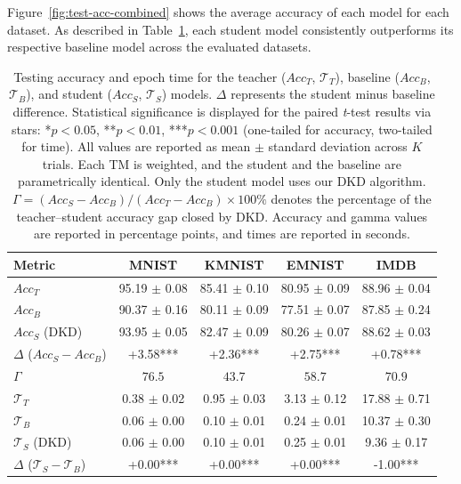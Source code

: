 \documentclass[sn-mathphys-num]{sn-jnl}%
\theoremstyle{thmstyleone}%
\theoremstyle{thmstyletwo}%
\theoremstyle{thmstylethree}%
\begin{document}
Figure~\ref{fig:test-acc-combined} shows the average accuracy of each model for each dataset. As described in Table~\ref{tab:test-table-dkd}, each student model consistently outperforms its respective baseline model across the evaluated datasets. 

\begin{table}
	\centering
	\caption{Testing accuracy and epoch time for the teacher ($Acc_T$, $\mathcal{T}_T$), baseline ($Acc_B$, $\mathcal{T}_B$), and student ($Acc_S$, $\mathcal{T}_S$) models. $\Delta$ represents the student minus baseline difference. Statistical significance is displayed for the paired \textit{t}-test results via stars: {*}$p < 0.05$, {**}$p < 0.01$, {***}$p < 0.001$ (one-tailed for accuracy, two-tailed for time). All values are reported as mean $\pm$ standard deviation across $K$ trials. Each TM is weighted, and the student and the baseline are parametrically identical. Only the student model uses our DKD algorithm. $\Gamma = (Acc_S - Acc_B)/(Acc_T - Acc_B) \times 100\%$ denotes the percentage of the teacher--student accuracy gap closed by DKD. Accuracy and gamma values are reported in percentage points, and times are reported in seconds.}
	\begin{tabular}{l|cccc}
		\hline
		Metric & MNIST & KMNIST & EMNIST & IMDB \\
		\hline
		$Acc_T$ & 95.19 $\pm$ 0.08 & 85.41 $\pm$ 0.10 & 80.95 $\pm$ 0.09 & 88.96 $\pm$ 0.04 \\
		$Acc_B$ & 90.37 $\pm$ 0.16 & 80.11 $\pm$ 0.09 & 77.51 $\pm$ 0.07 & 87.85 $\pm$ 0.24 \\
		$Acc_S$ (DKD) & 93.95 $\pm$ 0.05 & 82.47 $\pm$ 0.09 & 80.26 $\pm$ 0.07 & 88.62 $\pm$ 0.03 \\
		$\Delta$ ($Acc_S-Acc_B$) & +3.58*** & +2.36*** & +2.75*** & +0.78*** \\
		$\Gamma$             & $76.5$        & $43.7$        & $58.7$        & $70.9$        \\
		\hline
		$\mathcal{T}_T$ & 0.38 $\pm$ 0.02 & 0.95 $\pm$ 0.03 & 3.13 $\pm$ 0.12 & 17.88 $\pm$ 0.71 \\
		$\mathcal{T}_B$ & 0.06 $\pm$ 0.00 & 0.10 $\pm$ 0.01 & 0.24 $\pm$ 0.01 & 10.37 $\pm$ 0.30 \\
		$\mathcal{T}_S$ (DKD)& 0.06 $\pm$ 0.00 & 0.10 $\pm$ 0.01 & 0.25 $\pm$ 0.01 & 9.36 $\pm$ 0.17 \\
		$\Delta$ ($\mathcal{T}_S-\mathcal{T}_B$) & +0.00*** & +0.00*** & +0.00*** & -1.00*** \\
		\hline
	\end{tabular}
	\label{tab:test-table-dkd}
\end{table}
\end{document}
